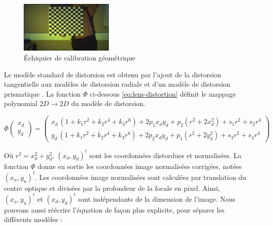\documentclass[../thesis.tex]{subfiles}
\begin{document}
    \begin{figure}[H]
        \centering
        \includegraphics[height=2.5cm]{img/preprocessing/echiquier}
        \caption{Échiquier de calibration géométrique}
        \label{fig:04-echiquier}
    \end{figure}
    
    Le modèle standard de distorsion est obtenu par l'ajout de la distorsion tangentielle aux modèles de distorsion radiale et d'un modèle de distorsion prismatique \cite{Wang:2008:NCM:1294369.1294525}. La fonction  $\Phi$ ci-dessous \eqref{eq:lens-distortion} définit le mappage polynomial $2D\rightarrow2D$ du modèle de distorsion.
    
    \begin{equation}
    \Phi
    \left(\begin{matrix} x_d \\ y_d \end{matrix}\right)
    =
    \left(\begin{matrix}
    x_d\,(1 + k_1 r^2 + k_2 r^4 + k_3 r^6) + 2 p_1 x_d y_d + p_2 (r^2 + 2 x_d^2) + s_1 r^2 + s_2 r^4 \\
    y_d\,(1 + k_1 r^2 + k_2 r^4 + k_3 r^6) + 2 p_2 x_d y_d + p_1 (r^2 + 2 y_d^2) + s_3 r^2 + s_4 r^4
    \end{matrix}\right)
    \label{eq:lens-distortion}
    \end{equation}
    
    \par Où $r^2 = x_d^2+y_d^2$, $(x_d,y_d)^t$ sont les coordonnées distordues et normalisées. La fonction $\Phi$ donne en sortie les coordonnées image normalisées corrigées, notées $(x_u,y_u)^t$. Les coordonnées image normalisées sont calculées par translation du centre optique et divisées par la profondeur de la focale en pixel. Ainsi, $(x_u,y_u)^t$ et $(x_d,y_d)^t$ sont indépendants de la dimension de l'image. Nous pouvons aussi réécrire l'équation de façon plus explicite, pour séparer les différents modèles :
    
\end{document}
